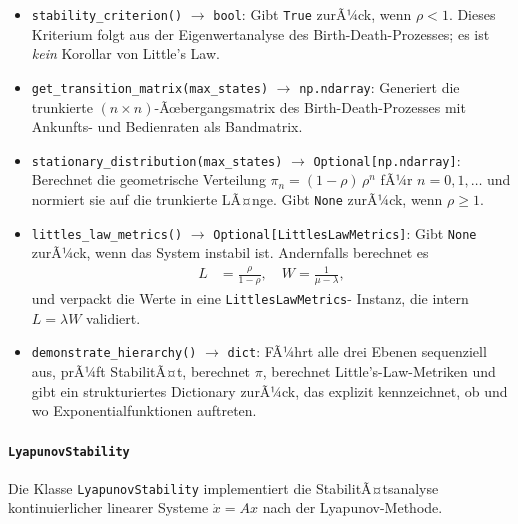 ﻿\documentclass[a4paper,12pt]{scrreprt}
\theoremstyle{definition}
\begin{document}
\begin{itemize}
	\item \texttt{stability\_criterion()} $\to$ \texttt{bool}:
	Gibt \texttt{True} zurÃ¼ck, wenn $\rho < 1$.  Dieses
	Kriterium folgt aus der Eigenwertanalyse des
	Birth-Death-Prozesses; es ist \emph{kein} Korollar von
	Little's Law.
	
	\item \texttt{get\_transition\_matrix(max\_states)} $\to$
	\texttt{np.ndarray}:  Generiert die trunkierte
	$(n \times n)$-Ãœbergangsmatrix des Birth-Death-Prozesses mit
	Ankunfts- und Bedienraten als Bandmatrix.
	
	\item \texttt{stationary\_distribution(max\_states)} $\to$
	\texttt{Optional[np.ndarray]}:  Berechnet die geometrische
	Verteilung $\pi_n = (1-\rho)\,\rho^n$ fÃ¼r $n = 0, 1, \ldots$
	und normiert sie auf die trunkierte LÃ¤nge.  Gibt
	\texttt{None} zurÃ¼ck, wenn $\rho \geq 1$.
	
	\item \texttt{littles\_law\_metrics()} $\to$
	\texttt{Optional[LittlesLawMetrics]}:  Gibt \texttt{None}
	zurÃ¼ck, wenn das System instabil ist.  Andernfalls berechnet
	es
	\begin{align}
		L &= \frac{\rho}{1-\rho}, \quad
		W  = \frac{1}{\mu - \lambda},
	\end{align}
	und verpackt die Werte in eine \texttt{LittlesLawMetrics}-
	Instanz, die intern \mbox{$L = \lambda W$} validiert.
	
	\item \texttt{demonstrate\_hierarchy()} $\to$ \texttt{dict}:
	FÃ¼hrt alle drei Ebenen sequenziell aus, prÃ¼ft StabilitÃ¤t,
	berechnet $\pi$, berechnet Little's-Law-Metriken und gibt
	ein strukturiertes Dictionary zurÃ¼ck, das explizit
	kennzeichnet, ob und wo Exponentialfunktionen auftreten.
\end{itemize}

\paragraph{\texttt{LyapunovStability}}

Die Klasse \texttt{LyapunovStability} implementiert die
StabilitÃ¤tsanalyse kontinuierlicher linearer Systeme
$\dot{x} = Ax$ nach der Lyapunov-Methode.
\end{document}
